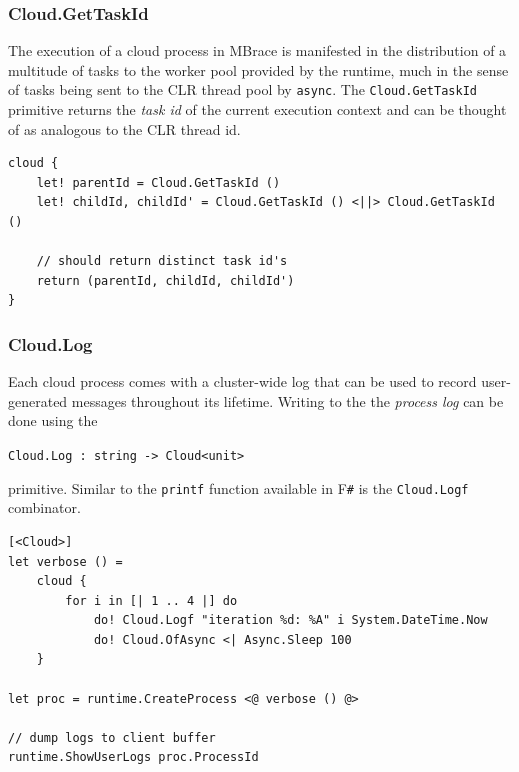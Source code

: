 \documentclass[9pt,a4paper]{article}
\newcommand{\mbrace}{MBrace}
\newcommand{\fsharp}{F\texttt \#}
\newcommand{\centertt}[1]{\begin{center}\texttt{#1}\end{center}}
\begin{document}
\subsubsection*{Cloud.GetTaskId}

The execution of a cloud process in \mbrace{} is manifested in the distribution of
a multitude of tasks to the worker pool provided by the runtime, much in the
sense of tasks being sent to the CLR thread pool by \texttt{async}.
The \texttt{Cloud.GetTaskId} primitive returns the \emph{task id} of the current
execution context and can be thought of as analogous to the CLR thread id.
\begin{lstlisting}
cloud {
	let! parentId = Cloud.GetTaskId ()
	let! childId, childId' = Cloud.GetTaskId () <||> Cloud.GetTaskId ()
	
	// should return distinct task id's
	return (parentId, childId, childId')
}
\end{lstlisting}

\subsubsection*{Cloud.Log}

Each cloud process comes with a cluster-wide log that can be used to record
user-generated messages throughout its lifetime. Writing to the
the \emph{process log} can be done using the
\centertt{Cloud.Log : string -> Cloud<unit>}
primitive. Similar to the \texttt{printf} function available in \fsharp{} 
is the \texttt{Cloud.Logf} combinator.
\begin{lstlisting}
[<Cloud>]
let verbose () =
    cloud {
        for i in [| 1 .. 4 |] do
            do! Cloud.Logf "iteration %d: %A" i System.DateTime.Now
            do! Cloud.OfAsync <| Async.Sleep 100
    }

let proc = runtime.CreateProcess <@ verbose () @>

// dump logs to client buffer
runtime.ShowUserLogs proc.ProcessId
\end{lstlisting}
\end{document}
